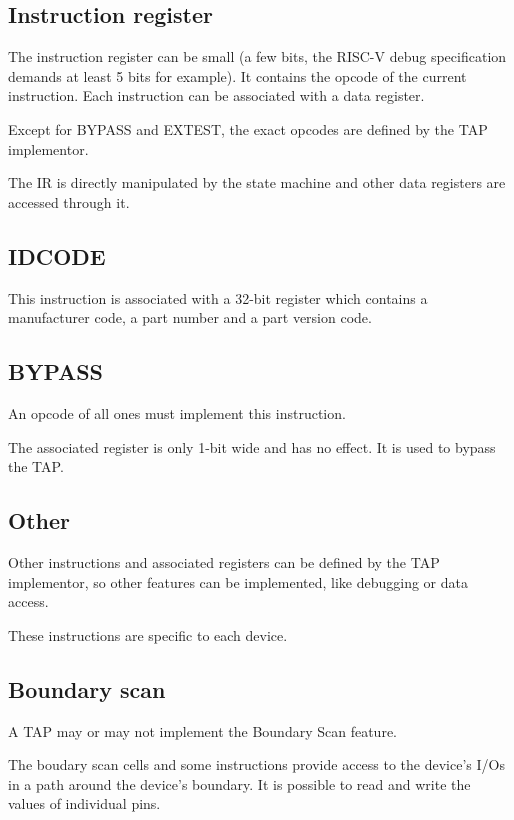 \documentclass{article}
\begin{document}
	\subsection{Instruction register}
	
	The instruction register can be small (a few bits, the RISC-V debug specification demands at least 5 bits for example). It contains the opcode of the current instruction. Each instruction can be associated with a data register.
	
	Except for BYPASS and EXTEST, the exact opcodes are defined by the TAP implementor.
	
	The IR is directly manipulated by the state machine and other data registers are accessed through it.
	
	\subsection{IDCODE}
	
	This instruction is associated with a 32-bit register which contains a manufacturer code, a part number and a part version code.
	
	\subsection{BYPASS}
	
	An opcode of all ones must implement this instruction.
	
	The associated register is only 1-bit wide and has no effect. It is used to bypass the TAP.
	
	\subsection{Other}
	
	Other instructions and associated registers can be defined by the TAP implementor, so other features can be implemented, like debugging or data access.
	
	These instructions are specific to each device.
	
	\subsection{Boundary scan}
	
	A TAP may or may not implement the Boundary Scan feature.
	
	The boudary scan cells and some instructions provide access to the device's I/Os in a path around the device's boundary. It is possible to read and write the values of individual pins.
	
\end{document}
